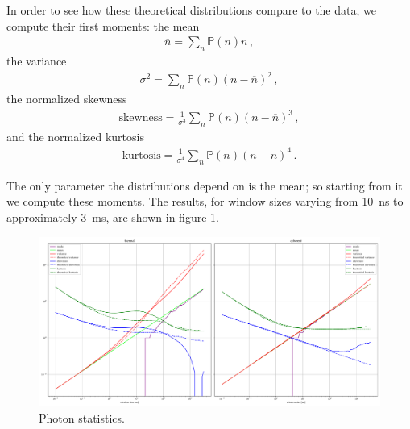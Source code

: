 \documentclass[main.tex]{subfiles}
\begin{document}
In order to see how these theoretical distributions compare to the data, we compute their first moments: the mean 
%
\begin{align}
\overline{n} = \sum _{n} \mathbb{P}(n) n
\,,
\end{align}
%
the variance 
%
\begin{align}
\sigma^2 = \sum _{n} \mathbb{P}(n) (n - \overline{n})^2
\,,
\end{align}
%
the normalized skewness 
%
\begin{align}
\text{skewness} = \frac{1}{\sigma^3} \sum _{n} \mathbb{P}(n) (n - \overline{n})^3
\,,
\end{align}
%
and the normalized kurtosis 
%
\begin{align}
\text{kurtosis} = \frac{1}{\sigma^4} \sum _{n} \mathbb{P}(n) (n - \overline{n})^4
\,.
\end{align}

The only parameter the distributions depend on is the mean; so starting from it we compute these moments. 
The results, for window sizes varying from \SI{10}{ns} to approximately \SI{3}{ms}, are shown in figure \ref{fig:photon_statistics}.

\begin{figure}
    \includegraphics[width=\textwidth]{figures/photon_statistics.pdf}
    \caption{Photon statistics.}
    \label{fig:photon_statistics}
\end{figure}
\end{document}
